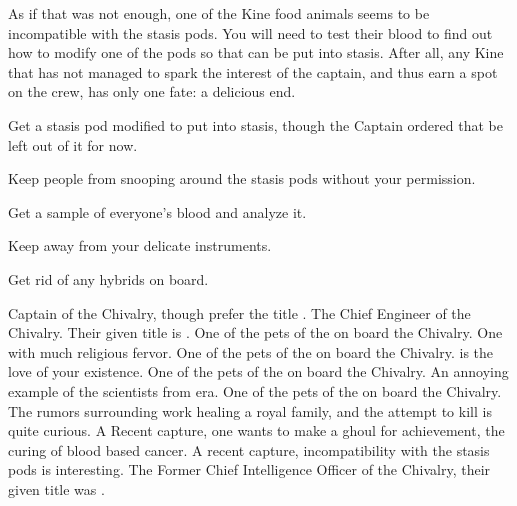 \documentclass[char]{guildcamp4}
\begin{document}
As if that was not enough, one of the Kine food animals seems to be incompatible with the stasis pods. You will need to test their blood to find out how to modify one of the pods so that \cPlead{\they} can be put into stasis. After all, any Kine that has not managed to spark the interest of the captain, and thus earn a spot on the crew, has only one fate: a delicious end. 

\begin{itemz}[Goals]
	\item Get a stasis pod modified to put \cPlead{} into stasis, though the Captain ordered that \cPlead{} be left out of it for now.
	\item Keep people from snooping around the stasis pods without your permission.
	\item Get a sample of everyone's blood and analyze it.
	\item Keep \cJames{} away from your delicate instruments.
	\item Get rid of any hybrids on board.
\end{itemz}

\begin{contacts}
	\contact{\cVone{}} Captain of the Chivalry, though \cVone{\they} prefer the title \cVone{\Duke}.
	\contact{\cVtwo{}} The Chief Engineer of the Chivalry. Their given title is \cVtwo{\Marq}.
	\contact{\cJoan{}} One of the pets of the \cVone{\Duke} on board the Chivalry. One with much religious fervor. 
	\contact{\cJulie{}} One of the pets of the \cVone{\Duke} on board the Chivalry. \cJulie{\they} is the love of your existence.
	\contact{\cJames{}} One of the pets of the \cVone{\Duke} on board the Chivalry. An annoying example of the scientists from \cJames{\their} era.
	\contact{\cRasputin{}} One of the pets of the \cVone{\Duke} on board the Chivalry. The rumors surrounding \cRasputin{\their} work healing a royal family, and the attempt to kill \cRasputin{\them} is quite curious.
	\contact{\cSpite{}} A Recent capture, one \cVone{} wants to make a ghoul for \cSpite{\their} achievement, the curing of blood based cancer.
	\contact{\cPlead{}} A recent capture, \cPlead{\their} incompatibility with the stasis pods is interesting.
	\contact{\cIntel{}} The Former Chief Intelligence Officer of the Chivalry, their given title was \cIntel{\Count}.
\end{contacts}
\end{document}
